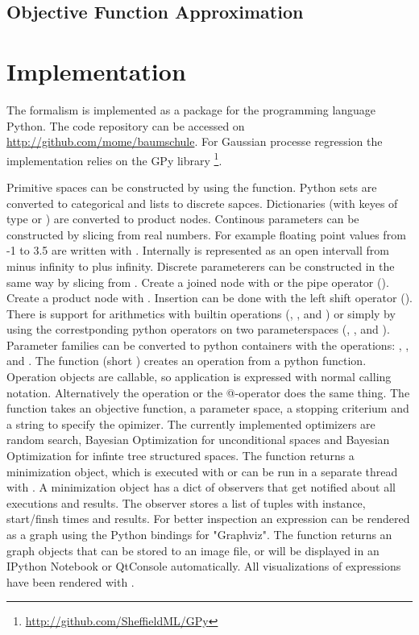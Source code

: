 \documentclass[english]{article}
\begin{document}
\subsection{Objective Function Approximation}


\section{Implementation}
The formalism is implemented as a package for the programming language Python. The code repository can be accessed on \url{http://github.com/mome/baumschule}. For Gaussian processe regression the implementation relies on the GPy library \footnote{\url{http://github.com/SheffieldML/GPy}}.

Primitive spaces can be constructed by using the  function. Python sets are converted to categorical and lists to discrete sapces. Dictionaries (with keyes of type  or ) are converted to product nodes. Continous parameters can be constructed by slicing from real numbers. For example floating point values from -1 to 3.5 are written with . Internally  is represented as an open intervall from minus infinity to plus infinity. Discrete parameterers can be constructed in the same way by slicing from . Create a joined node with  or the pipe operator (\python{|}). Create a product node with . Insertion can be done with the left shift operator (\python{<<}). There is support for arithmetics with builtin operations (, ,  and ) or simply by using the correstponding python operators on two parameterspaces (\python{+}, \python{-}, \python{*} and \python{/}). Parameter families can be converted to python containers with the operations: , ,  and .
The  function (short ) creates an operation from a python function. Operation objects are callable, so application is expressed with normal calling notation. Alternatively the  operation or the @-operator does the same thing. The  function takes an objective function, a parameter space, a stopping criterium and a string to specify the opimizer.  The currently implemented optimizers are random search, Bayesian Optimization for unconditional spaces and Bayesian Optimization for infinte tree structured spaces. The  function returns a minimization object, which is executed with  or can be run in a separate thread with . A minimization object has a dict of observers that get notified about all executions and results. The  observer stores a list of tuples with instance, start/finsh times and results.
For better inspection an expression can be rendered as a graph using the Python bindings for "Graphviz". The  function returns an graph objects that can be stored to an image file, or will be displayed in an IPython Notebook or QtConsole automatically. All visualizations of expressions have been rendered with .
\end{document}
